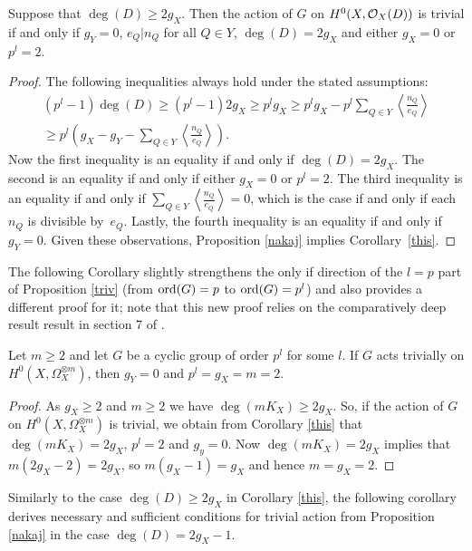     \begin{cor}\label{this}
    Suppose that $\deg(D)\geq 2g_X$. Then the action of $G$ on $H^0(X,{\cal O}_X(D))$ is trivial if and 
    only if $g_Y = 0$, $e_Q | n_Q$ for all $Q\in Y$, $\deg(D)=2g_X$ and either $g_X=0$ or $p^l=2$.
    \end{cor}
    \begin{proof}
    The following inequalities always hold under the stated assumptions:
        \begin{multline}
        (p^l-1)\deg(D)\geq (p^l-1)2g_X \geq p^lg_X \geq p^lg_X-p^l\sum_{Q\in Y}\left\langle\frac{n_Q}{e_Q}\right\rangle \\ \geq p^l\left( g_X - g_Y -\sum_{Q\in Y}\left\langle \frac{n_Q}{e_Q} \right\rangle \right).
        \end{multline}
    Now the first inequality is an equality if and only if $\deg(D)=2g_X$. 
    The second is an equality if and only if either $g_X=0$ or $p^l=2$. 
    The third inequality is an equality if and only if $\sum_{Q\in Y}\left\langle\frac{n_Q}{e_Q}\right\rangle=0$, which is the case if and only if each $n_Q$ is divisible by~$e_Q$. 
    Lastly, the fourth inequality is an equality if and only if $g_Y = 0$.
    Given these observations, Proposition \ref{nakaj} implies Corollary~\ref{this}.
    \end{proof}

The following Corollary slightly strengthens the only if direction of the $l=p$ part of Proposition \ref{triv}
(from $\operatorname{ord}(G) = p$ to $\operatorname{ord}(G) = p^l$) and also provides a different proof for it;
note that this new proof relies on the comparatively deep result result in section 7 of \cite{cohogsheaves}.


    \begin{cor}
    Let $m \geq 2$ and let $G$ be a cyclic group of order $p^l$ for some $l$. 
    If $G$ acts trivially on $H^0(X,\Omega_X^{\otimes m})$, then $g_Y = 0$ and $p^l = g_X = m = 2$.
    \end{cor}
    \begin{proof}
    As $g_X \geq 2$ and $m\geq 2$ we have $\deg(mK_X) \geq 2g_X$. 
    So, if the action of $G$ on $H^0(X,\Omega_X^{\otimes m})$ is trivial, we obtain from Corollary \ref{this} that $\deg(mK_X) = 2g_X$, $p^l = 2$ and $g_y = 0$.
    Now $\deg (mK_X) = 2g_X$ implies that $m(2g_X -2 ) = 2g_X$, so $m(g_X -1) = g_X$ and hence $m=g_X=2$.
    \end{proof}

Similarly to the case $\deg(D)\geq 2g_X$ in Corollary \ref{this}, the following corollary derives necessary and sufficient conditions for trivial action from Proposition \ref{nakaj} in the case $\deg(D) =2g_X-1$.



